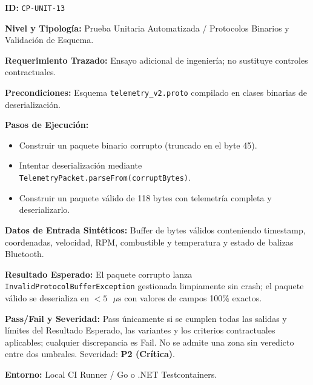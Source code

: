 \par\noindent\textbf{ID:} \texttt{CP-\allowbreak{}UNIT-\allowbreak{}13}\par
\par\noindent\textbf{Nivel y Tipología:} Prueba Unitaria Automatizada / Protocolos Binarios y Validación de Esquema.\par
\par\noindent\textbf{Requerimiento Trazado:} Ensayo adicional de ingeniería; no sustituye controles contractuales.\par
\par\noindent\textbf{Precondiciones:} Esquema \texttt{telemetry\_\allowbreak{}v2.proto} compilado en clases binarias de deserialización.\par
\par\noindent\textbf{Pasos de Ejecución:}\par
\begin{itemize}
\item Construir un paquete binario corrupto (truncado en el byte 45).
\item Intentar deserialización mediante \texttt{Telemetry\allowbreak{}Packet.\allowbreak{}parse\allowbreak{}From(\allowbreak{}corrupt\allowbreak{}Bytes)}.
\item Construir un paquete válido de 118 bytes con telemetría completa y deserializarlo.
\end{itemize}

\par\noindent\textbf{Datos de Entrada Sintéticos:} Buffer de bytes válidos conteniendo timestamp, coordenadas, velocidad, RPM, combustible y temperatura y estado de balizas Bluetooth.\par
\par\noindent\textbf{Resultado Esperado:} El paquete corrupto lanza \texttt{Invalid\allowbreak{}Protocol\allowbreak{}Buffer\allowbreak{}Exception} gestionada limpiamente sin crash; el paquete válido se deserializa en \(< 5\text{ }\mu\text{s}\) con valores de campos 100\% exactos.\par
\par\noindent\textbf{Pass/Fail y Severidad:} Pass únicamente si se cumplen todas las salidas y límites del Resultado Esperado, las variantes y los criterios contractuales aplicables; cualquier discrepancia es Fail. No se admite una zona sin veredicto entre dos umbrales. Severidad: \textbf{P2 (Crítica)}.\par
\par\noindent\textbf{Entorno:} Local CI Runner / Go o .NET Testcontainers.\par


